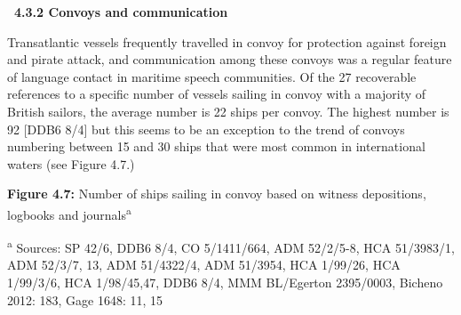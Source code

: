 \begin{styleStandard}
\textbf{\ 4.3.2 Convoys and communication}
\end{styleStandard}


\begin{styleStandard}
Transatlantic vessels frequently travelled in convoy for protection against foreign and pirate attack, and communication among these convoys was a regular feature of language contact in maritime speech communities. Of the 27 recoverable references to a specific number of vessels sailing in convoy with a majority of British sailors, the average number is 22 ships per convoy. The highest number is 92 [DDB6 8/4] but this seems to be an exception to the trend of convoys numbering between 15 and 30 ships that were most common in international waters (see Figure 4.7.) 
\end{styleStandard}


\begin{styleStandard}
  [Warning: Image ignored] %
 
\end{styleStandard}


\begin{styleStandard}
\textbf{Figure 4.7:} Number of ships sailing in convoy based on witness depositions, logbooks and journals\textsuperscript{a}
\end{styleStandard}

\begin{styleStandard}
\textsuperscript{a }Sources: SP 42/6, DDB6 8/4, CO 5/1411/664, ADM 52/2/5-8, HCA 51/3983/1, ADM 52/3/7, 13, ADM 51/4322/4, ADM 51/3954, HCA 1/99/26, HCA 1/99/3/6, HCA 1/98/45,47, DDB6 8/4, MMM BL/Egerton 2395/0003, Bicheno 2012: 183, Gage 1648: 11, 15
\end{styleStandard}

